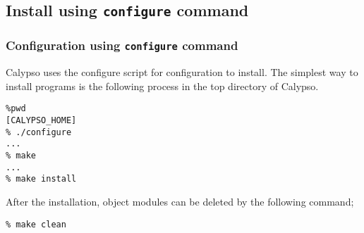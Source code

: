 \subsection{Install using {\tt configure} command }
\subsubsection{Configuration using {\tt configure} command }
Calypso uses the configure script for configuration to install. The simplest way to install programs is the following process in the top directory of Calypso.
% 
\begin{verbatim}
%pwd
[CALYPSO_HOME]
% ./configure
...
% make
...
% make install
\end{verbatim}
%
After the installation, object modules can be deleted by the following command;
% 
\begin{verbatim}
% make clean
\end{verbatim}
%

